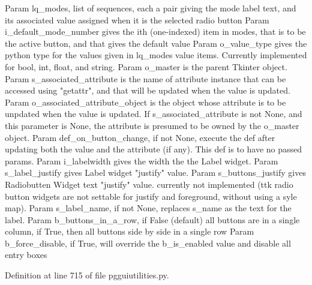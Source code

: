 \begin{DoxyVerb}Param lq_modes, list of sequences, each a pair
    giving the mode label text, and its associated value
    assigned when it is the selected radio button
Param i_default_mode_number gives the ith (one-indexed)
    item in modes, that is to be the active button,
    and that gives the default value
Param o_value_type gives the python type for the values
    given in lq_modes value items.  Currently implemented
    for bool, int, float, and string.
Param o_master is the parent Tkinter object.
Param s_associated_attribute is the name of 
    attribute instance that can be accessed
    using "getattr", and that will be
    updated when the value is updated.
Param o_associated_attribute_object is the object whose attribute
    is to be unpdated when the value is updated.  If
    s_associated_attribute is not None, and this parameter
    is None, the attribute is presumed to be
    owned by the o_master object.
Param def_on_button_change, if not None, execute the def
    after updating both the value and the attribute (if any).
    This def is to have no passed params.
Param i_labelwidth gives the width the the Label widget.
Param s_label_justify gives Label widget "justify" value.
Param s_buttons_justify gives Radiobutten Widget text "justify" value.
currently not implemented (ttk radio button widgets are not
settable for justify and foreground, without using a syle map).
Param s_label_name, if not None, replaces s_name as the text for the label.
Param b_buttons_in_a_row, if False (default) all buttons are in a single column, if True,
then all buttons side by side in a single row
Param b_force_disable, if True, will override the b_is_enabled value and disable all entry 
      boxes
\end{DoxyVerb}
 

Definition at line 715 of file pgguiutilities.\+py.


